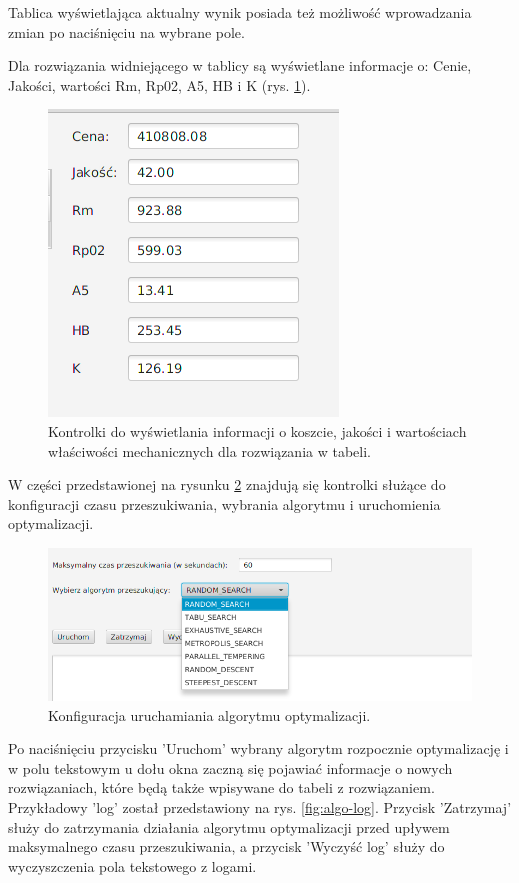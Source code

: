 Tablica wyświetlająca aktualny wynik posiada też możliwość wprowadzania zmian po naciśnięciu na wybrane pole.

Dla rozwiązania widniejącego w tablicy są wyświetlane informacje o: Cenie, Jakości, wartości Rm, Rp02, A5, HB i K (rys. \ref{fig:data-view}).

\begin{figure}[ht]{}
	\centering
	\includegraphics[scale=0.7]{images/data.png}
	\caption {
		 Kontrolki do wyświetlania informacji o koszcie, jakości i wartościach właściwości mechanicznych dla rozwiązania w tabeli.
	}
	\label{fig:data-view}
\end{figure}

W części przedstawionej na rysunku \ref{fig:algo-config} znajdują się kontrolki służące do konfiguracji czasu przeszukiwania, wybrania algorytmu i uruchomienia optymalizacji.

\begin{figure}[ht]{}
	\centering
	\includegraphics[scale=0.7]{images/algo_config.png}
	\caption {
		 Konfiguracja uruchamiania algorytmu optymalizacji.
	}
	\label{fig:algo-config}
\end{figure}

Po naciśnięciu przycisku 'Uruchom' wybrany algorytm rozpocznie optymalizację i w polu tekstowym u dołu okna zaczną się pojawiać informacje o nowych rozwiązaniach, które będą także wpisywane do tabeli z rozwiązaniem. Przykładowy 'log' został przedstawiony na rys. \ref{fig:algo-log}. Przycisk 'Zatrzymaj' służy do zatrzymania działania algorytmu optymalizacji przed upływem maksymalnego czasu przeszukiwania, a przycisk 'Wyczyść log' służy do wyczyszczenia pola tekstowego z logami.

